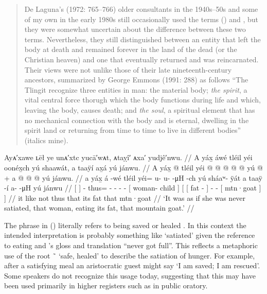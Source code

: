 \begin{quote}\small
De Laguna’s (1972: 765–766) older consultants in the 1940s–50s and some of my own in the early 1980s still occasionally used the terms ()  and , but they were somewhat uncertain about the difference between these two terms.
Nevertheless, they still distinguished between an entity that left the body at death and remained forever in the land of the dead (or the Christian heaven) and one that eventually returned and was reincarnated.
Their views were not unlike those of their late nineteenth-century ancestors, summarized by George Emmons (1991: 288) as follows “The Tlingit recognize three entities in man: the material body; \emph{the spirit}, a vital central force thorugh which the body functions during life and which, leaving the body, causes death; and \emph{the soul}, a spiritual element that has no mechanical connection with the body and is eternal, dwelling in the spirit land or returning from time to time to live in different bodies” (italics mine).
\end{quote}

\ex\label{ex:91-94-never-saved-woman-eating-goat-fat}%
%
\begingl
	\glpreamble	Ayᴀ′xawe ʟēł ye unᴀ′xtc yucā′wᴀt, ᴀtaỵî′ ᴀxa′ yudjê′nwu. //
	\glpreamble	A yáx̱ áwé tléil yéi oonéx̱ch yú shaawát, a taaÿí ax̱á yú jánwu. //
	\gla	{} A yáx̱ {}  @ {}
		tléil yéi @  @ {} @ {} @ {} @ {}
		{} yú  @ {} {} +
		{} {} a  @ {} {}
			 @ {} @ {}
			{} yú jánwu. {} {}  //
	\glb	{} a yáx̱ {} á -wé
		tléil yéi= u- u-  -μH -ch
		{} yú sháaʷ- ÿát {}
		{} {} a taaÿ -í {}
			a-  -μH
			{} yú jánwu {} {} //
	\glc	{}[   {}]  -
		 thus= - -  - -
		{}[  woman- child {}]
		{}[ {}[  fat - {}]
			-  -
			{}[  mtn·goat {}] {}] //
	\gld	{} it like {}  {}
		not thus  {} {} {} {}
		{} that  {} {}
		{} {} its fat {} {}
			 {} {}
			{} that mtn·goat {} //
	\glft	‘It was as if she was never satiated, that woman, eating its fat, that mountain goat.’
		//
\endgl
\xe

The phrase  in (\lastx) literally refers to being saved or healed \parencite[cf.][107.1384]{story-naish:1973}.
In this context the intended interpretation is probably something like ‘satiated’ given the reference to eating and \citeauthor{swanton:1909}’s gloss and translation “never got full”.
This reflects a metaphoric use of the root  \~\  ‘safe, healed’ to describe the satiation of hunger.
For example, after a satisfying meal an aristocratic guest might say  ‘I am saved; I am rescued’.
Some speakers do not recognize this usage today, suggesting that this may have been used primarily in higher registers such as in public oratory.

